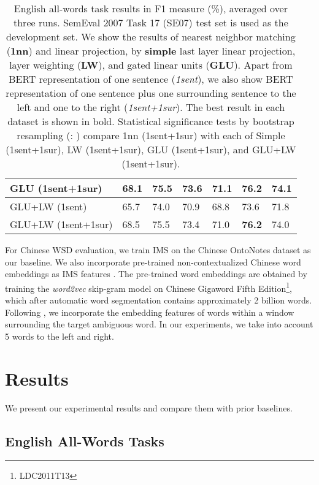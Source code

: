 \documentclass[11pt,a4paper]{article}
\begin{document}
\begin{table*}[ht]
\begin{tabular}{|l|l||l|l|l|l|l|}
GLU (1sent+1sur) & 68.1 & 75.5 & 73.6 & \textbf{71.1} & \textbf{76.2} & \textbf{74.1}\\\hline
GLU+LW (1sent) & 65.7 & 74.0 & 70.9 & 68.8 & 73.6 & 71.8 \\ 
GLU+LW (1sent+1sur) & 68.5 & 75.5 & 73.4 & 71.0 & \textbf{76.2} & 74.0\\
\hline
\end{tabular}
\caption{\label{tab:results_aw} English all-words task results in F1 measure (\%), averaged over three runs. SemEval 2007 Task 17 (SE07) test set is used as the development set. We show the results of nearest neighbor matching (\textbf{1nn}) and linear projection, by \textbf{simple} last layer linear projection, layer weighting (\textbf{LW}), and gated linear units (\textbf{GLU}). Apart from BERT representation of one sentence (\textit{1sent}), we also show BERT representation of one sentence plus one surrounding sentence to the left and one to the right (\textit{1sent+1sur}). The best result in each dataset is shown in bold. Statistical significance tests by bootstrap resampling (: ) compare 1nn (1sent+1sur) with each of Simple (1sent+1sur), LW (1sent+1sur), GLU (1sent+1sur), and GLU+LW (1sent+1sur).}
\end{table*} 
For Chinese WSD evaluation, we train IMS \cite{zhong_it_2010} on the Chinese OntoNotes dataset as our baseline. We also incorporate pre-trained non-contextualized Chinese word embeddings as IMS features \cite{taghipour_semi-supervised_2015,iacobacci_embeddings_2016}. The pre-trained word embeddings are obtained by training the \textit{word2vec} skip-gram model on Chinese Gigaword Fifth Edition\footnote{LDC2011T13}, which after automatic word segmentation contains approximately 2 billion words. Following \cite{taghipour_semi-supervised_2015}, we incorporate the embedding features of words within a window surrounding the target ambiguous word. In our experiments, we take into account 5 words to the left and right.

\section{Results}
\label{sec:results}

We present our experimental results and compare them with prior baselines.

\subsection{English All-Words Tasks}
\label{sec:results_aw}
\end{document}
